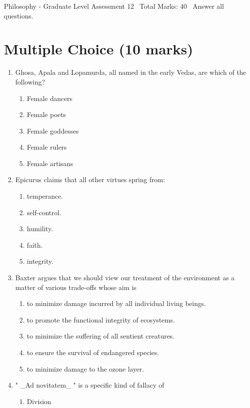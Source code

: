 \documentclass[12pt]{article}
\begin{document}
\begin{center}
Philosophy - Graduate Level Assessment 12 \
Total Marks: 40 \
Answer all questions.
\end{center}

\section*{Multiple Choice (10 marks)}
\begin{enumerate}[label=\arabic*.]
\item Ghosa, Apala and Lopamurda, all named in the early Vedas, are which of the following?
\begin{enumerate}[label=(\alph*)]
    \item Female dancers
    \item Female poets
    \item Female goddesses
    \item Female rulers
    \item Female artisans
\end{enumerate}
\item Epicurus claims that all other virtues spring from:
\begin{enumerate}[label=(\alph*)]
    \item temperance.
    \item self-control.
    \item humility.
    \item faith.
    \item integrity.
\end{enumerate}
\item Baxter argues that we should view our treatment of the environment as a matter of various trade-offs whose aim is
\begin{enumerate}[label=(\alph*)]
    \item to minimize damage incurred by all individual living beings.
    \item to promote the functional integrity of ecosystems.
    \item to minimize the suffering of all sentient creatures.
    \item to ensure the survival of endangered species.
    \item to minimize damage to the ozone layer.
\end{enumerate}
\item " \_Ad novitatem\_ " is a specific kind of fallacy of
\begin{enumerate}[label=(\alph*)]
    \item Division

\end{enumerate}
\end{enumerate}
\end{document}
